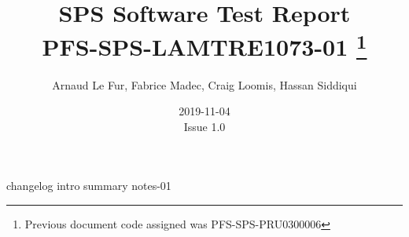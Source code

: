\documentclass[12pt]{article}
\begin{document}
\title{\acrshort{SPS} Software Test Report \\ \large PFS-SPS-LAMTRE1073-01
\footnote{Previous document code assigned was PFS-SPS-PRU0300006}}
\author{Arnaud Le Fur, Fabrice Madec, Craig Loomis, Hassan Siddiqui}
\date{2019-11-04\\Issue 1.0}
\maketitle

\tableofcontents
\newpage

%
%
{changelog}
{intro}
{summary}
{notes-01}

%
%
\printglossary[type=\acronymtype]
\printglossary
\end{document}

